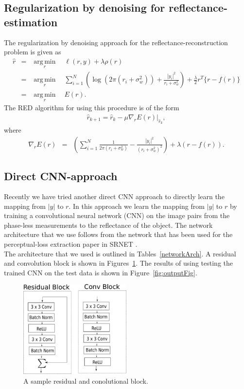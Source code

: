 \documentclass[a4paper, 11pt]{article}
\DeclareMathOperator*{\argmin}{arg\,min}
\begin{document}
\subsection{Regularization by denoising for reflectance-estimation }
The regularization by denoising approach for the reflectance-reconstruction problem is given as 
\begin{eqnarray*}
\hat{r}&=&\underset{r}{\argmin} \quad \ell(r,y)+\lambda \rho(r) \\
&=& \underset{r}{\argmin} \quad \sum_{i=1}^N \left(\log (2\pi (r_i+\sigma_w^2))+\frac{|y_i|^2}{r_i+\sigma_w^2}\right) + \frac{\lambda}{2} r^T\{r-f(r)\} \\
&=&  \underset{r}{\argmin} \quad E(r). 
\end{eqnarray*}
The RED algorithm for using this procedure is of the form 
\begin{eqnarray*}
\hat{r}_{k+1}=\hat{r}_k-\mu \nabla_rE(r)|_{\hat{r}_k}, 
\end{eqnarray*}
where 
\begin{eqnarray*}
\nabla_rE(r)&=& \left(\sum_{i=1}^N \frac{1}{2\pi(r_i+\sigma_w^2)}-\frac{|y_i|^2}{(r_i+\sigma_w^2)^2}\right)+\lambda(r-f(r)). 
\end{eqnarray*}

\clearpage 
\newpage 
\subsection{Direct CNN-approach}
Recently we have tried another direct CNN approach to directly learn the mapping from $|y|$ to $r$. In this approach we learn the mapping from $|y|$ to $r$ by training a convolutional neural network (CNN) on the image pairs from the phase-less measurements to the reflectance of the object. The network architecture that we use follows from the network that has been used for the perceptual-loss extraction paper in SRNET \cite{SRNET}. \\
The architecture that we used is outlined in Tables~\ref{networkArch}. A residual and convolution block is shown in Figures~\ref{residualConvBlock}. The results of using testing the trained CNN on the test data is shown in Figure~\ref{fig:outputFig}. 
\begin{figure}
\centering
\includegraphics[width=0.5\textwidth]{../Figures/residualConvBlock.pdf}
\caption{A sample residual and conolutional block.}
\label{residualConvBlock}
\end{figure}
\end{document}
